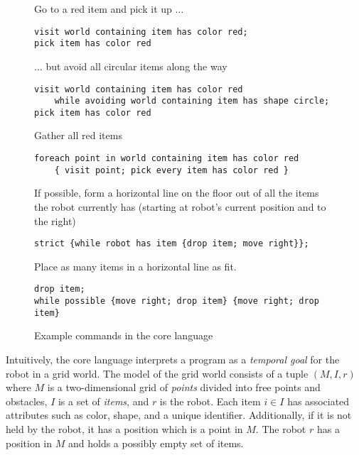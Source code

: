 \begin{figure}
\begin{example}\label{ex:example1}
Go to a red item and pick it up $\ldots$
\begin{lstlisting}
visit world containing item has color red;
pick item has color red
\end{lstlisting}
$\ldots$ but avoid all circular items along the way
\begin{lstlisting}
visit world containing item has color red
    while avoiding world containing item has shape circle;
pick item has color red
\end{lstlisting}
\vspace{-10pt}
\end{example}

\begin{example}\label{ex:example2}
Gather all red items
\begin{lstlisting}
foreach point in world containing item has color red
    { visit point; pick every item has color red }
\end{lstlisting}
\vspace{-10pt}
\end{example}

\begin{example}\label{ex:example3}
If possible, form a horizontal line on the floor out of all the items
  the robot currently has (starting at robot's current position and to the right)
    \begin{lstlisting}
strict {while robot has item {drop item; move right}};
    \end{lstlisting}
    \vspace{-10pt}
\end{example}

\begin{example}\label{ex:example4}
Place as many items in a horizontal line as fit.
  \begin{lstlisting}
drop item;
while possible {move right; drop item} {move right; drop item}
  \end{lstlisting}
  \vspace{-10pt}
  \end{example}
\caption{Example commands in the core language}
\label{fig:core-examples}
\end{figure}


Intuitively, the core language interprets a program as a
\emph{temporal goal} for the robot in a grid world.
The model of the grid world consists of a tuple $(M, I, r)$ where
$M$ is a two-dimensional grid of \emph{points} divided into free points and obstacles,
$I$ is a set of \emph{items}, and $r$ is the robot.
Each item $i \in I$ has associated attributes such as color, shape, and a unique identifier.
Additionally, if it is not held by the robot, it has a position which is a point in $M$.
The robot $r$ has a position in $M$ and holds a possibly empty set of items.

